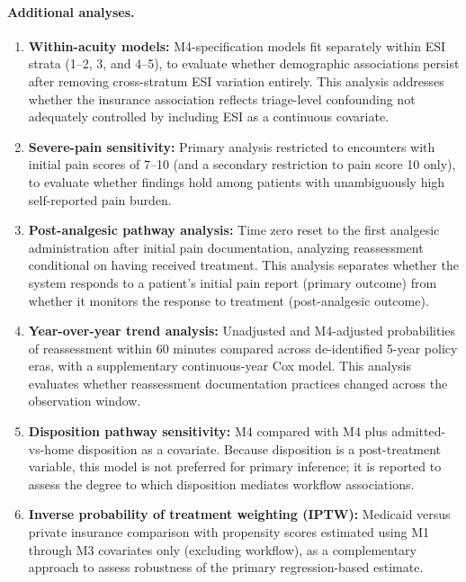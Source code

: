 \paragraph{Additional analyses.}
\label{sec:sensitivity}
\begin{enumerate}
  \item \textbf{Within-acuity models:} M4-specification models fit separately within ESI strata (1--2, 3, and 4--5), to evaluate whether demographic associations persist after removing cross-stratum ESI variation entirely. This analysis addresses whether the insurance association reflects triage-level confounding not adequately controlled by including ESI as a continuous covariate.

  \item \textbf{Severe-pain sensitivity:} Primary analysis restricted to encounters with initial pain scores of 7--10 (and a secondary restriction to pain score 10 only), to evaluate whether findings hold among patients with unambiguously high self-reported pain burden.

  \item \textbf{Post-analgesic pathway analysis:} Time zero reset to the first analgesic administration after initial pain documentation, analyzing reassessment conditional on having received treatment. This analysis separates whether the system responds to a patient's initial pain report (primary outcome) from whether it monitors the response to treatment (post-analgesic outcome).

  \item \textbf{Year-over-year trend analysis:} Unadjusted and M4-adjusted probabilities of reassessment within 60 minutes compared across de-identified 5-year policy eras, with a supplementary continuous-year Cox model. This analysis evaluates whether reassessment documentation practices changed across the observation window.

  \item \textbf{Disposition pathway sensitivity:} M4 compared with M4 plus admitted-vs-home disposition as a covariate. Because disposition is a post-treatment variable, this model is not preferred for primary inference; it is reported to assess the degree to which disposition mediates workflow associations.

  \item \textbf{Inverse probability of treatment weighting (IPTW):} Medicaid versus private insurance comparison with propensity scores estimated using M1 through M3 covariates only (excluding workflow), as a complementary approach to assess robustness of the primary regression-based estimate.


\end{enumerate}
